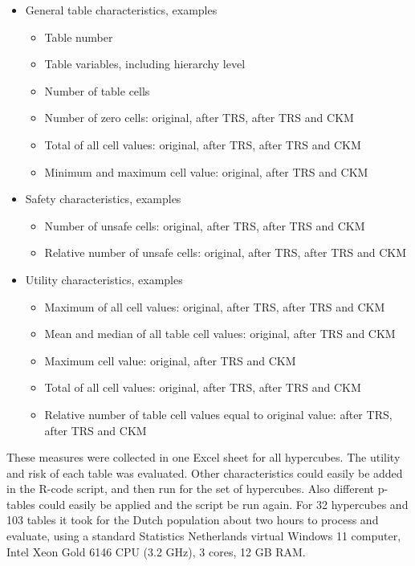 \begin{itemize}
\item General table characteristics, examples
\begin{itemize}
\item Table number
\item Table variables, including hierarchy level
\item Number of table cells
\item Number of zero cells: original, after TRS, after TRS and CKM
\item Total of all cell values: original, after TRS, after TRS and CKM
\item Minimum and maximum cell value: original, after TRS and CKM
\end{itemize}
\item Safety characteristics, examples
\begin{itemize}
\item Number of unsafe cells: original, after TRS, after TRS and CKM
\item Relative number of unsafe cells: original, after TRS, after TRS and CKM
\end{itemize}
\item Utility characteristics, examples
\begin{itemize}
\item Maximum of all cell values: original, after TRS, after TRS and CKM
\item Mean and median of all table cell values: original, after TRS and CKM
\item Maximum cell value: original, after TRS and CKM
\item Total of all cell values: original, after TRS, after TRS and CKM
\item Relative number of table cell values equal to original value: after TRS, after TRS and CKM
\end{itemize}
\end{itemize}

These measures were collected in one Excel sheet for all hypercubes. The utility and risk of each table was evaluated. Other characteristics could easily be added in the R-code script, and then run for the set of hypercubes. Also different p-tables could easily be applied and the script be run again. For 32 hypercubes and 103 tables it took for the Dutch population about two hours to process and evaluate, using a standard Statistics Netherlands virtual Windows 11 computer, Intel Xeon Gold 6146 CPU (3.2 GHz), 3 cores, 12 GB RAM.

